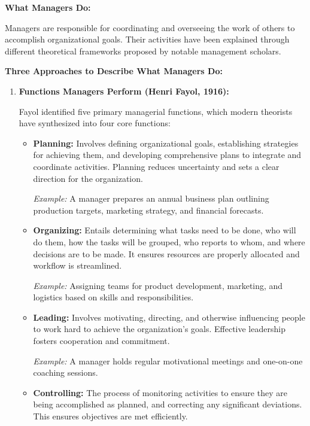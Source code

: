 \documentclass[10pt,a4paper]{book}
\begin{document}
\begin{multicols}{2}

\textbf{What Managers Do:}

Managers are responsible for coordinating and overseeing the work of others to accomplish organizational goals. Their activities have been explained through different theoretical frameworks proposed by notable management scholars.

\vspace{0.5cm}

\textbf{Three Approaches to Describe What Managers Do:}

\begin{enumerate}
    \item \textbf{Functions Managers Perform (Henri Fayol, 1916):}

    Fayol identified five primary managerial functions, which modern theorists have synthesized into four core functions:

    \begin{itemize}
        \item \textbf{Planning:} 
        Involves defining organizational goals, establishing strategies for achieving them, and developing comprehensive plans to integrate and coordinate activities. Planning reduces uncertainty and sets a clear direction for the organization.
        
        \textit{Example:} A manager prepares an annual business plan outlining production targets, marketing strategy, and financial forecasts.

        \item \textbf{Organizing:} 
        Entails determining what tasks need to be done, who will do them, how the tasks will be grouped, who reports to whom, and where decisions are to be made. It ensures resources are properly allocated and workflow is streamlined.

        \textit{Example:} Assigning teams for product development, marketing, and logistics based on skills and responsibilities.

        \item \textbf{Leading:}
        Involves motivating, directing, and otherwise influencing people to work hard to achieve the organization’s goals. Effective leadership fosters cooperation and commitment.

        \textit{Example:} A manager holds regular motivational meetings and one-on-one coaching sessions.

        \item \textbf{Controlling:}
        The process of monitoring activities to ensure they are being accomplished as planned, and correcting any significant deviations. This ensures objectives are met efficiently.


\end{itemize}
\end{enumerate}
\end{multicols}
\end{document}
